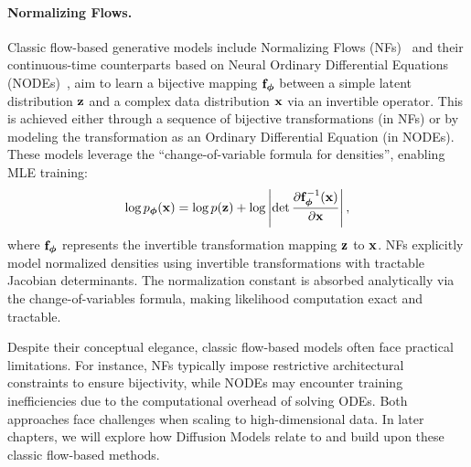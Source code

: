 \paragraph{Normalizing Flows.}
Classic flow-based generative models include Normalizing Flows (NFs)~\citep{rezende2015variational}
and their continuous-time counterparts based on Neural Ordinary Differential Equations
(NODEs)~\citep{chen2018neural}, aim to learn a bijective mapping ${\mathbf{f}}_{\bm{\phi}}$ between a simple latent distribution $ {\mathbf{z}} $ and a complex data distribution $ {\mathbf{x}} $ via an invertible operator. This is achieved either through a sequence of bijective transformations (in NFs) or by modeling the transformation as an Ordinary Differential Equation (in NODEs). These models leverage the ``change-of-variable formula for densities'', enabling MLE training:
\begin{equation*}
    \log p_{\bm{\phi}}({\mathbf{x}}) = \log p({\mathbf{z}}) + \log \left| \det \frac{\partial {\mathbf{f}}_{\bm{\phi}}^{-1}({\mathbf{x}})}{\partial {\mathbf{x}}} \right|,
\end{equation*}
where $ {\mathbf{f}}_{\bm{\phi}} $ represents the invertible transformation mapping $ {\mathbf{z}} $ to $ {\mathbf{x}} $. NFs explicitly model normalized densities using invertible transformations with tractable Jacobian determinants. The normalization constant is absorbed analytically via the change-of-variables formula, making likelihood computation exact and tractable.

Despite their conceptual elegance, classic flow-based models often face practical limitations. For instance, NFs typically impose restrictive architectural constraints to ensure bijectivity, while NODEs may encounter training inefficiencies due to the computational overhead of solving ODEs. Both approaches face challenges when scaling to high-dimensional data. In later chapters, we will explore how Diffusion Models relate to and build upon these classic flow-based methods.




